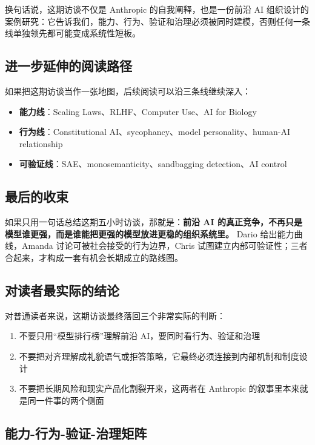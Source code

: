\documentclass[a4paper]{article}
\begin{document}
换句话说，这期访谈不仅是 Anthropic 的自我阐释，也是一份前沿 AI 组织设计的案例研究：它告诉我们，能力、行为、验证和治理必须被同时建模，否则任何一条线单独领先都可能变成系统性短板。

\subsection{进一步延伸的阅读路径}

如果把这期访谈当作一张地图，后续阅读可以沿三条线继续深入：

\begin{itemize}
    \item \textbf{能力线}：Scaling Laws、RLHF、Computer Use、AI for Biology
    \item \textbf{行为线}：Constitutional AI、sycophancy、model personality、human-AI relationship
    \item \textbf{可验证线}：SAE、monosemanticity、sandbagging detection、AI control
\end{itemize}

\subsection{最后的收束}

如果只用一句话总结这期五小时访谈，那就是：\textbf{前沿 AI 的真正竞争，不再只是模型谁更强，而是谁能把更强的模型放进更稳的组织系统里。} Dario 给出能力曲线，Amanda 讨论可被社会接受的行为边界，Chris 试图建立内部可验证性；三者合起来，才构成一套有机会长期成立的路线图。

\subsection{对读者最实际的结论}

对普通读者来说，这期访谈最终落回三个非常实际的判断：

\begin{enumerate}
    \item 不要只用``模型排行榜''理解前沿 AI，要同时看行为、验证和治理
    \item 不要把对齐理解成礼貌语气或拒答策略，它最终必须连接到内部机制和制度设计
    \item 不要把长期风险和现实产品化割裂开来，这两者在 Anthropic 的叙事里本来就是同一件事的两个侧面
\end{enumerate}

\subsection{能力-行为-验证-治理矩阵}
\end{document}
